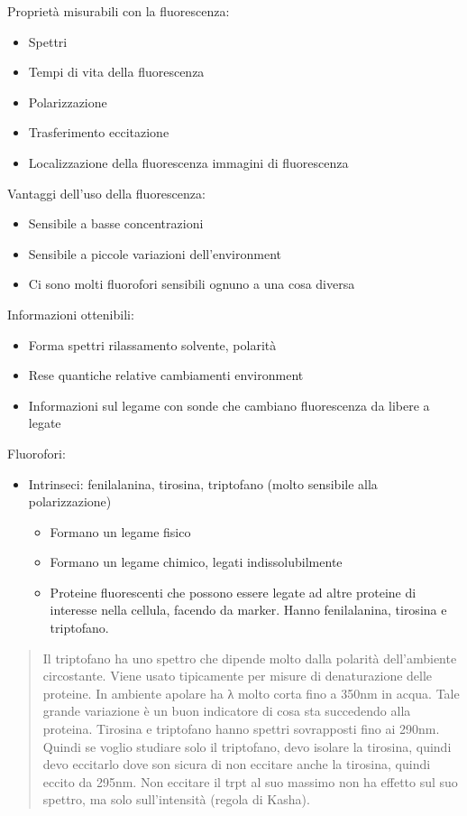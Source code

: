 Proprietà misurabili con la fluorescenza:

\begin{itemize}
\item
  Spettri
\item
  Tempi di vita della fluorescenza
\item
  Polarizzazione
\item
  Trasferimento eccitazione
\item
  Localizzazione della fluorescenza immagini di fluorescenza
\end{itemize}

Vantaggi dell'uso della fluorescenza:

\begin{itemize}
\item
  Sensibile a basse concentrazioni
\item
  Sensibile a piccole variazioni dell'environment
\item
  Ci sono molti fluorofori sensibili ognuno a una cosa diversa
\end{itemize}

Informazioni ottenibili:

\begin{itemize}
\item
  Forma spettri rilassamento solvente, polarità
\item
  Rese quantiche relative cambiamenti environment
\item
  Informazioni sul legame con sonde che cambiano fluorescenza da libere
  a legate
\end{itemize}

Fluorofori:

\begin{itemize}
\item
  Intrinseci: fenilalanina, tirosina, triptofano (molto sensibile alla
  polarizzazione)

  \begin{itemize}
  \item
    Formano un legame fisico
  \item
    Formano un legame chimico, legati indissolubilmente
  \item
    Proteine fluorescenti che possono essere legate ad altre proteine di
    interesse nella cellula, facendo da marker. Hanno fenilalanina,
    tirosina e triptofano.
  \end{itemize}
\end{itemize}

\begin{quote}
Il triptofano ha uno spettro che dipende molto dalla polarità
dell'ambiente circostante. Viene usato tipicamente per misure di
denaturazione delle proteine. In ambiente apolare ha λ molto corta fino
a 350nm in acqua. Tale grande variazione è un buon indicatore di cosa
sta succedendo alla proteina. Tirosina e triptofano hanno spettri
sovrapposti fino ai 290nm. Quindi se voglio studiare solo il triptofano,
devo isolare la tirosina, quindi devo eccitarlo dove son sicura di non
eccitare anche la tirosina, quindi eccito da 295nm. Non eccitare il trpt
al suo massimo non ha effetto sul suo spettro, ma solo sull'intensità
(regola di Kasha).
\end{quote}

